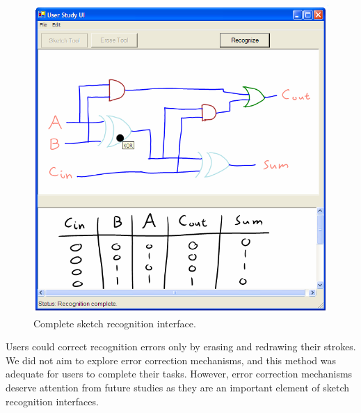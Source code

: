 \documentclass{egpubl}
\begin{document}
\begin{figure}[tb]
  \centering \includegraphics[width=0.85\linewidth]{fullGUIdemo.png}
  \caption{Complete sketch recognition interface. }
  \label{fig:fullGUIdemo}
\end{figure}


Users could correct recognition errors only by erasing and redrawing
their strokes.  We did not aim to explore error correction mechanisms,
and this method was adequate for users to complete their tasks.
However, error correction mechanisms deserve attention from future studies as
they are an important element of sketch recognition interfaces.




\end{document}
